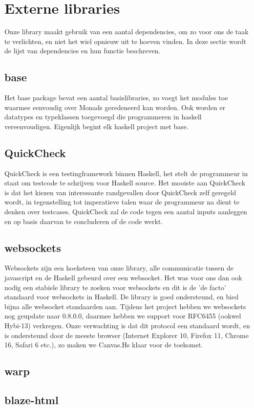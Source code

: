 \section{Externe libraries}
Onze library maakt gebruik van een aantal dependencies, om zo voor ons de taak te verlichten, en niet het wiel opnieuw uit te hoeven vinden. In deze sectie wordt de lijst van dependencies en hun functie beschreven.
\subsection{base}
Het base package bevat een aantal basislibraries, zo voegt het modules toe waarmee eenvoudig over Monads geredeneerd kan worden. Ook worden er datatypes en typeklassen toegevoegd die programmeren in haskell vereenvoudigen. Eigenlijk begint elk haskell project met base.
\subsection{QuickCheck}
QuickCheck is een testingframework binnen Haskell, het stelt de programmeur in staat om testcode te schrijven voor Haskell source. Het mooiste aan QuickCheck is dat het kiezen van interessante randgevallen door QuickCheck zelf geregeld wordt, in tegenstelling tot imperatieve talen waar de programmeur na dient te denken over testcases. QuickCheck zal de code tegen een aantal inputs aanleggen en op basis daarvan te concluderen of de code werkt.
\subsection{websockets}
Websockets zijn een hoeksteen van onze library, alle communicatie tussen de javascript en de Haskell gebeurd over een websocket. Het was voor ons dan ook nodig een stabiele library te zoeken voor websockets en dit is de 'de facto' standaard voor websockets in Haskell. De library is goed ondersteund, en bied bijna alle websocket standaarden aan. Tijdens het project hebben we websockets nog geupdate naar 0.8.0.0, daarmee hebben we support voor RFC6455 (ookwel Hybi-13) verkregen. Onze verwachting is dat dit protocol een standaard wordt, en is ondersteund door de meeste browser (Internet Explorer 10, Firefox 11, Chrome 16, Safari 6 etc.), zo maken we Canvas.Hs klaar voor de toekomst.
\subsection{warp}

\subsection{blaze-html}
